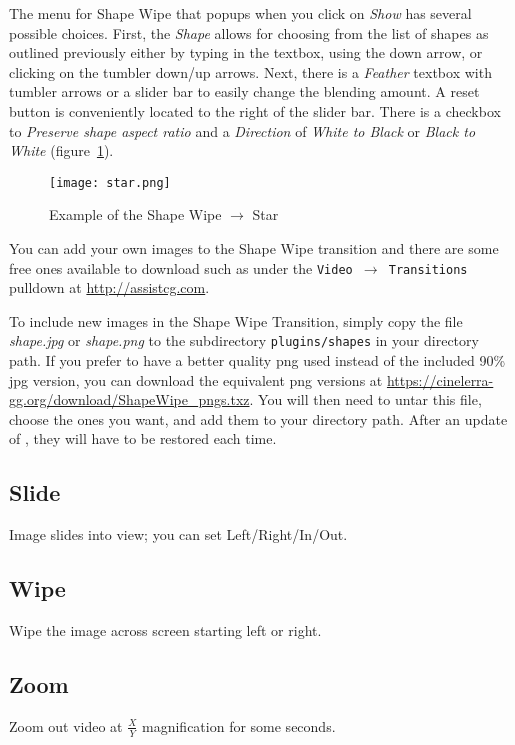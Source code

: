 The menu for Shape Wipe that popups when you click on \textit{Show} has several possible choices.  First, the \textit{Shape} allows for choosing from the list of shapes as outlined previously either by typing in the textbox, using the down arrow, or clicking on the tumbler down/up arrows.
Next, there is a \textit{Feather} textbox with tumbler arrows or a slider bar to easily change the blending amount.  A reset button is conveniently located to the right of the slider bar.  There is a checkbox to \textit{Preserve shape aspect ratio} and a \textit{Direction} of \textit{White to Black} or \textit{Black to White} (figure~\ref{fig:star}).

\begin{figure}[htpb] \centering
	\texttt{[image: star.png]}
	\caption{Example of the Shape Wipe $\rightarrow$ Star}
	\label{fig:star}
\end{figure}

You can add your own images to the Shape Wipe transition and there are some free ones available to download such as under the \texttt{Video $\rightarrow$ Transitions} pulldown at {\small \url{http://assistcg.com}}.

To include new images in the Shape Wipe Transition, simply copy the file \textit{shape.jpg} or
\textit{shape.png} to the subdirectory \texttt{plugins/shapes} in your \CGG{} directory path. If
you prefer to have a better quality png used instead of the included 90\% jpg version, you can download
the equivalent png versions at {\small \url{https://cinelerra-gg.org/download/ShapeWipe\_pngs.txz}}.
You will then need to untar this file, choose the ones you want, and add them to your directory path.
After an update of \CGG{}, they will have to be restored each time.

\subsection*{Slide}%
\label{sub:slide}

Image slides into view; you can set Left/Right/In/Out.

\subsection*{Wipe}%
\label{sub:wipe}

Wipe the image across screen starting left or right.

\subsection*{Zoom}%
\label{sub:zoom}

Zoom out video at $\frac{X}{Y}$ magnification for some seconds.

